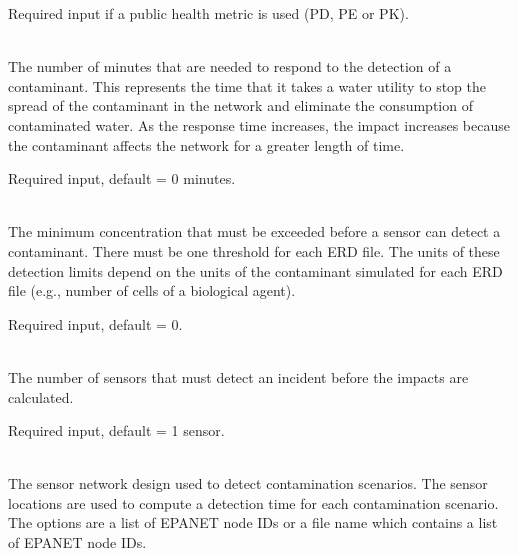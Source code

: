 \begin{description}[topsep=0pt,parsep=0.5em,itemsep=-0.4em]
\begin{description}[topsep=0pt,parsep=0.5em,itemsep=-0.4em]
                Required input if a public health metric is used (PD, PE or PK).
    \item[{response time}]\hfill
\\The number of minutes that are needed to respond to the
                detection of a contaminant. This represents the time that it takes
                a water utility to stop the spread of the contaminant in the network and 
                eliminate the consumption of contaminated water. As the response time increases,
                the impact increases because the contaminant affects the network
                for a greater length of time.  
                
                Required input, default = 0 minutes.
    \item[{detection limit}]\hfill
\\The minimum concentration that must be exceeded before a sensor can detect a contaminant.
                There must be one threshold for each ERD file. The units of
                these detection limits depend on the units of the contaminant
                simulated for each ERD file (e.g., number of cells of a
                biological agent).  
                
                Required input, default = 0.
    \item[{detection confidence}]\hfill
\\The number of sensors that must detect an incident before
                the impacts are calculated.  
                
                Required input, default = 1 sensor.
  \end{description}
  \item[{flushing}]\hfill
  \begin{description}[topsep=0pt,parsep=0.5em,itemsep=-0.4em]
    \item[{detection}]\hfill
\\The sensor network design used to detect contamination scenarios. The
                sensor locations are used to compute a detection time for each 
                contamination scenario. The options are a list of 
                EPANET node IDs or a file name which contains a list of EPANET node IDs.
                

\end{description}
\end{description}
